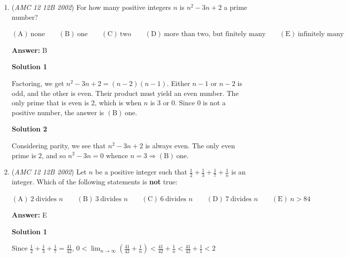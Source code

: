 \begin{enumerate}
 



\textbf{Solution 2}

Inputting 4 into $x$ in the original equation,

 
 \[[3(4)-2][4(4)+1]-[3(4)-2][4(4)]+1 = 170-160+1 = \boxed{\mathrm{(D)}\ 11}\]



	\item (\textit{AMC 12 12B 2002}) For how many positive integers $n$ is $n^2 - 3n + 2$ a prime number?


 $\mathrm{(A)}\ \text{none} \qquad\mathrm{(B)}\ \text{one} \qquad\mathrm{(C)}\ \text{two} \qquad\mathrm{(D)}\ \text{more\ than\ two,\ but\ finitely\ many} \qquad\mathrm{(E)}\ \text{infinitely\ many}$

 \textbf{Answer: }B



\textbf{Solution 1}

Factoring, we get $n^2 - 3n + 2 = (n-2)(n-1)$. Either $n-1$ or $n-2$ is odd, and the other is even.  Their product must yield an even number.  The only prime that is even is $2$, which is when $n$ is $3$ or $0$. Since $0$ is not a positive number, the answer is $\boxed{\mathrm{(B)}\ \text{one}}$.

 



\textbf{Solution 2}

Considering parity, we see that $n^2 - 3n + 2$ is always even.  The only even prime is $2$, and so $n^2-3n=0$ whence $n=3\Rightarrow\boxed{\mathrm{(B)}\ \text{one}}$.

 


	\item (\textit{AMC 12 12B 2002}) Let $n$ be a positive integer such that $\frac 12 + \frac 13 + \frac 17 + \frac 1n$ is an integer. Which of the following statements is \textbf{not} true:


 $\mathrm{(A)}\ 2\ \text{divides\ }n \qquad\mathrm{(B)}\ 3\ \text{divides\ }n \qquad\mathrm{(C)}\ 6\ \text{divides\ }n \qquad\mathrm{(D)}\ 7\ \text{divides\ }n \qquad\mathrm{(E)}\ {n > 84}$

 \textbf{Answer: }E



\textbf{Solution 1}

Since $\frac 12 + \frac 13 + \frac 17  = \frac {41}{42}$, $0 < \lim_{n \rightarrow \infty} \left(\frac{41}{42} + \frac{1}{n}\right) < \frac {41}{42} + \frac 1n < \frac{41}{42} + \frac 11 < 2$


\end{enumerate}
